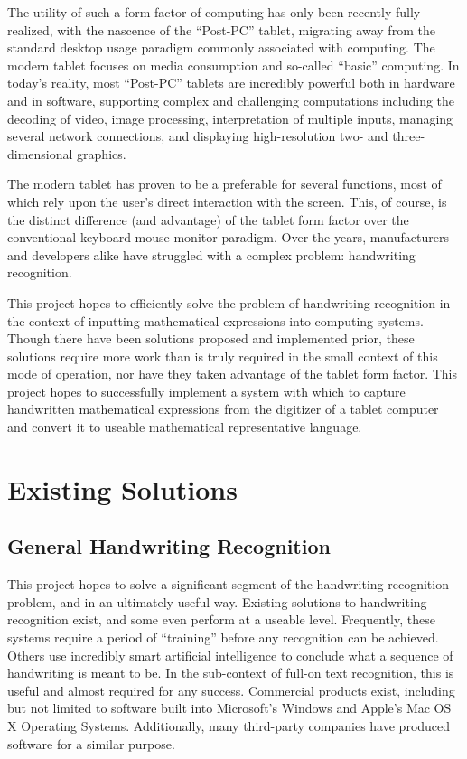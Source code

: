 \documentclass{acm_proc_article-sp}
\begin{document}
The utility of such a form factor of computing has only been recently fully realized, with the nascence of the ``Post-PC'' tablet, migrating away from the standard desktop usage paradigm commonly associated with computing. The modern tablet focuses on media consumption and so-called ``basic'' computing. In today's reality, most ``Post-PC'' tablets are incredibly powerful both in hardware and in software, supporting complex and challenging computations including the decoding of video, image processing, interpretation of multiple inputs, managing several network connections, and displaying high-resolution two- and three-dimensional graphics.

The modern tablet has proven to be a preferable for several functions, most of which rely upon the user's direct interaction with the screen. This, of course, is the distinct difference (and advantage) of the tablet form factor over the conventional keyboard-mouse-monitor paradigm. Over the years, manufacturers and developers alike have struggled with a complex problem: handwriting recognition.

This project hopes to efficiently solve the problem of handwriting recognition in the context of inputting mathematical expressions into computing systems. Though there have been solutions proposed and implemented prior, these solutions require more work than is truly required in the small context of this mode of operation, nor have they taken advantage of the tablet form factor. This project hopes to successfully implement a system with which to capture handwritten mathematical expressions from the digitizer of a tablet computer and convert it to useable mathematical representative language.

\section{Existing Solutions}

\subsection{General Handwriting Recognition} 
This project hopes to solve a significant segment of the handwriting recognition problem, and in an ultimately useful way. Existing solutions to handwriting recognition exist, and some even perform at a useable level. Frequently, these systems require a period of ``training'' before any recognition can be achieved. Others use incredibly smart artificial intelligence to conclude what a sequence of handwriting is meant to be. In the sub-context of full-on text recognition, this is useful and almost required for any success. Commercial products exist, including but not limited to software built into Microsoft's Windows and Apple's Mac OS X Operating Systems. Additionally, many third-party companies have produced software for a similar purpose.
\end{document}
